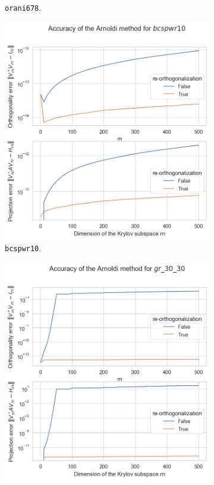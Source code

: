 \begin{figure}[h!]
\begin{subfigure}[b]{0.45\textwidth}
        \caption{\texttt{orani678}.}
    \end{subfigure}
    \vfill
    \begin{subfigure}[b]{0.45\textwidth}
        \includegraphics[width=\textwidth]{img/arnoldi/bcspwr10.png}
        \caption{\texttt{bcspwr10}.}
    \end{subfigure}
    \hfill
    \begin{subfigure}[b]{0.45\textwidth}
        \includegraphics[width=\textwidth]{img/arnoldi/gr_30_30.png}

\end{subfigure}
\end{figure}
